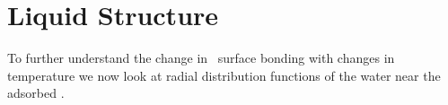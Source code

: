\section {Liquid Structure}

To further understand the change in \suldiox~surface bonding with changes in temperature we now look at radial distribution functions of the water near the adsorbed \suldiox.
